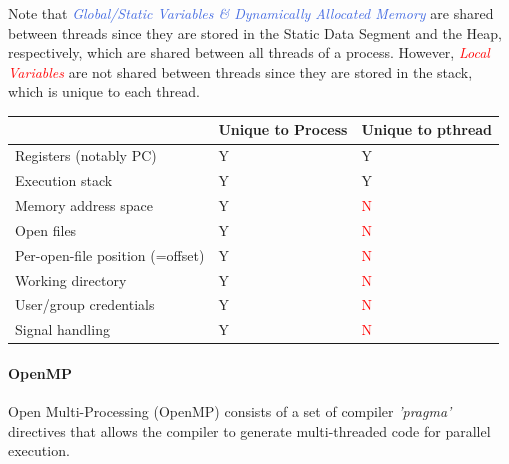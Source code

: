 \documentclass[openany,12pt]{book}
\newcommand{\red}[1]{\textcolor{Red}{#1}}
\newcommand{\blue}[1]{\textcolor{RoyalBlue}{#1}}
\begin{document}
Note that \blue{\textit{Global/Static Variables \& Dynamically Allocated Memory}} are shared between threads since they are stored in the Static Data Segment and the Heap, respectively, which are shared between all threads of a process. However, \red{\textit{Local Variables}} are not shared between threads since they are stored in the stack, which is unique to each thread.


\begin{samepage}
  \begin{center}
    \begin{tabular}{|>{\raggedright\arraybackslash}p{6cm}|
      >{\centering\arraybackslash}p{4cm}|
      >{\centering\arraybackslash}p{4cm}|}
      \hline
      \rowcolor{blue!30}
                                       & \textbf{Unique to Process} & \textbf{Unique to pthread} \\
      \hline
      Registers (notably PC)           & Y                          & Y                          \\
      Execution stack                  & Y                          & Y                          \\
      Memory address space             & Y                          & \red{N}                    \\
      Open files                       & Y                          & \red{N}                    \\
      Per-open-file position (=offset) & Y                          & \red{N}                    \\
      Working directory                & Y                          & \red{N}                    \\
      User/group credentials           & Y                          & \red{N}                    \\
      Signal handling                  & Y                          & \red{N}                    \\
      \hline
    \end{tabular}
  \end{center}
\end{samepage}


\newpage
\paragraph{OpenMP} Open Multi-Processing (OpenMP) consists of a set of compiler \textit{'pragma'} directives that allows the compiler to generate multi-threaded code for parallel execution.
\end{document}
